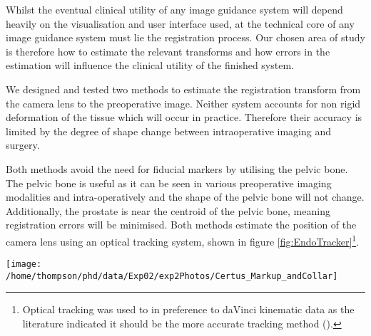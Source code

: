 Whilst the eventual clinical utility of any image guidance system will depend heavily on the
visualisation and user interface used, at the technical core of any image 
guidance system must lie the registration process. Our chosen area of study is therefore
how to estimate the relevant transforms and how errors in the estimation 
will influence the clinical utility of the finished system.

We designed and tested two methods to estimate the registration transform 
from the camera lens to the preoperative image. Neither system accounts for
non rigid deformation of the tissue which will occur in practice. Therefore 
their accuracy is limited by the degree of shape change between intraoperative 
imaging and surgery. 

Both methods avoid the need for fiducial markers by utilising the pelvic bone. 
The pelvic bone is useful as it can be seen in various preoperative imaging 
modalities and intra-operatively and the shape of the pelvic bone
will not change. Additionally, the prostate is near the centroid of the
pelvic bone, meaning registration errors will be minimised.
Both methods estimate the position of the camera lens using 
an optical tracking system, shown in figure \ref{fig:EndoTracker}\footnote{
Optical tracking was used to in preference to 
daVinci kinematic data as the literature indicated it should be the
more accurate tracking method (\cite{pap171,pap164,pap153}).}.

\begin{figure*}
\begin{center}
\texttt{[image: /home/thompson/phd/data/Exp02/exp2Photos/Certus\_Markup\_andCollar]}
\end{center}
\caption{\label{fig:EndoTracker}The laparoscope is tracked with 14 infra red emitting diodes 
attached to a collar. The position of each diode is tracked using a three camera
Optotrak Certus system.}
\end{figure*}

